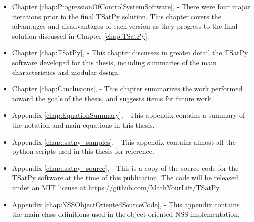 \begin{itemize}
\item Chapter \ref{chap:ProgressionOfControlSystemSoftware},  - There were four major iterations prior to the final TSatPy solution.  This chapter covers the advantages and disadvantages of each version as they progress to the final solution discussed in Chapter \ref{chap:TSatPy}.
\item Chapter \ref{chap:TSatPy},  - This chapter discusses in greater detail the TSatPy software developed for this thesis, including summaries of the main characteristics and modular design.
\item Chapter \ref{chap:Conclusions},  - This chapter summarizes the work performed toward the goals of the thesis, and suggests items for future work.
\item Appendix \ref{chap:EquationSummary},  - This appendix contains a summary of the notation and main equations in this thesis.
\item Appendix \ref{chap:tsatpy_samples},  - This appendix contains almost all the python scripts used in this thesis for reference.
\item Appendix \ref{chap:tsatpy_source},  - This is a copy of the source code for the TSatPy software at the time of this publication.  The code will be released under an MIT license at https://github.com/MathYourLife/TSatPy.
\item Appendix \ref{chap:NSSObjectOrientedSourceCode},  - This appendix contains the main class definitions used in the object oriented NSS implementation.
\end{itemize}

